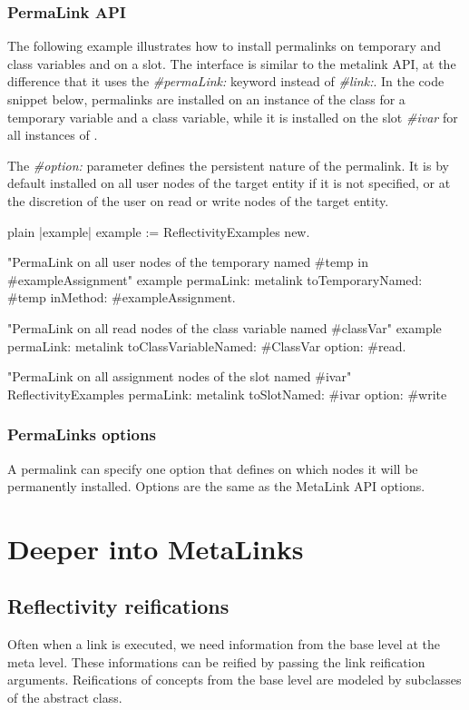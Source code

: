 \documentclass[10pt,twoside,english]{_support/latex/sbabook/sbabook}
\begin{document}
\subsection{PermaLink API}
The following example illustrates how to install permalinks on temporary and class variables and on a slot. The interface is similar to the metalink API, at the difference that it uses the \textit{\#permaLink:} keyword instead of \textit{\#link:}. In the code snippet below, permalinks are installed on an instance of the  class for a temporary variable and a class variable, while it is installed on the slot \textit{\#ivar} for all instances of .

The \textit{\#option:} parameter defines the persistent nature of the permalink. It is by default installed on all user nodes of the target entity if it is not specified, or at the discretion of the user on read or write nodes of the target entity.

\begin{displaycode}{plain}
|example|
example := ReflectivityExamples new.

"PermaLink on all user nodes of the temporary named #temp in #exampleAssignment"
example permaLink: metalink toTemporaryNamed: #temp inMethod: #exampleAssignment.

"PermaLink on all read nodes of the class variable named #classVar"
example permaLink: metalink toClassVariableNamed: #ClassVar option: #read.

"PermaLink on all assignment nodes of the slot named #ivar"
ReflectivityExamples permaLink: metalink toSlotNamed: #ivar option: #write
\end{displaycode}
\subsection{PermaLinks options}
A permalink can specify one option that defines on which nodes it will be permanently installed. Options are the same as the MetaLink API options.


\chapter{Deeper into MetaLinks}\section{Reflectivity reifications}
Often when a link is executed, we need information from the base level at the meta level. These informations can be reified by passing the link reification arguments. Reifications of concepts from the base level are modeled by subclasses of the  abstract class.
\end{document}
